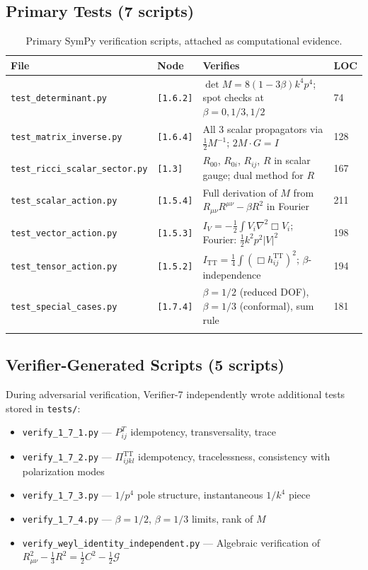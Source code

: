 \documentclass[11pt,a4paper]{article}
\newcommand{\lap}{\nabla^2}
\newcommand{\dbox}{\Box}
\newcommand{\TT}{\mathrm{TT}}
\newcommand{\afnode}[1]{\texttt{[#1]}}
\begin{document}
\subsection{Primary Tests (7 scripts)}

\begin{longtable}{llp{6.5cm}l}
\toprule
\textbf{File} & \textbf{Node} & \textbf{Verifies} & \textbf{LOC} \\
\midrule
\endhead
\texttt{test\_determinant.py} & \afnode{1.6.2} &
$\det M = 8(1-3\beta)k^4p^4$; spot checks at $\beta = 0, 1/3, 1/2$ & 74 \\
\texttt{test\_matrix\_inverse.py} & \afnode{1.6.4} &
All 3 scalar propagators via $\tfrac{1}{2}M^{-1}$; $2M \cdot G = I$ & 128 \\
\texttt{test\_ricci\_scalar\_sector.py} & \afnode{1.3} &
$R_{00}$, $R_{0i}$, $R_{ij}$, $R$ in scalar gauge; dual method for $R$ & 167 \\
\texttt{test\_scalar\_action.py} & \afnode{1.5.4} &
Full derivation of $M$ from $R_{\mu\nu}R^{\mu\nu} - \beta R^2$ in Fourier & 211 \\
\texttt{test\_vector\_action.py} & \afnode{1.5.3} &
$I_V = -\tfrac{1}{2}\int V_i\lap\dbox V_i$; Fourier: $\tfrac{1}{2}k^2p^2|V|^2$ & 198 \\
\texttt{test\_tensor\_action.py} & \afnode{1.5.2} &
$I_{\TT} = \tfrac{1}{4}\int(\dbox h^{\TT}_{ij})^2$; $\beta$-independence & 194 \\
\texttt{test\_special\_cases.py} & \afnode{1.7.4} &
$\beta = 1/2$ (reduced DOF), $\beta = 1/3$ (conformal), sum rule & 181 \\
\bottomrule
\caption{Primary SymPy verification scripts, attached as computational evidence.}
\label{tab:tests}
\end{longtable}

\subsection{Verifier-Generated Scripts (5 scripts)}

During adversarial verification, Verifier-7 independently wrote additional
tests stored in \texttt{tests/}:

\begin{itemize}
\item \texttt{verify\_1\_7\_1.py} --- $P^T_{ij}$ idempotency, transversality, trace
\item \texttt{verify\_1\_7\_2.py} --- $\Pi^{\TT}_{ijkl}$ idempotency, tracelessness,
  consistency with polarization modes
\item \texttt{verify\_1\_7\_3.py} --- $1/p^4$ pole structure, instantaneous $1/k^4$ piece
\item \texttt{verify\_1\_7\_4.py} --- $\beta = 1/2$, $\beta = 1/3$ limits, rank of $M$
\item \texttt{verify\_weyl\_identity\_independent.py} --- Algebraic verification of
  $R_{\mu\nu}^2 - \tfrac{1}{3}R^2 = \tfrac{1}{2}C^2 - \tfrac{1}{2}\mathcal{G}$
\end{itemize}
\end{document}
